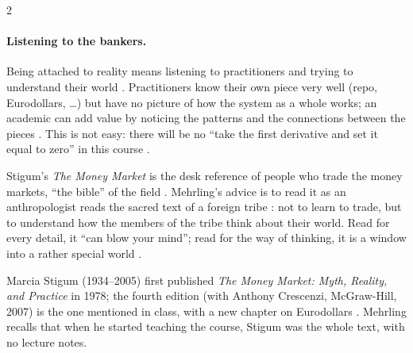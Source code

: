 \begin{paracol}{2}
\paragraph{Listening to the bankers.} Being attached to reality means listening to practitioners and
trying to understand their world . Practitioners know their own piece very well (repo,
Eurodollars, \dots) but have no picture of how the system as a whole works; an academic can add value
by noticing the patterns and the connections between the pieces . This is not easy:
there will be no ``take the first derivative and set it equal to zero'' in this course .

\begin{intuition}
Stigum's \emph{The Money Market} is the desk reference of people who trade the money markets, ``the
bible'' of the field . Mehrling's advice is to read it as an anthropologist reads the
sacred text of a foreign tribe : not to learn to trade, but to understand how the
members of the tribe think about their world. Read for every detail, it ``can blow your mind''; read for
the way of thinking, it is a window into a rather special world .
\end{intuition}\begin{aside}[Stigum]
Marcia Stigum (1934--2005) first published \emph{The Money Market: Myth, Reality, and Practice} in 1978;
the fourth edition (with Anthony Crescenzi, McGraw-Hill, 2007) is the one mentioned in class, with a
new chapter on Eurodollars . Mehrling recalls that when he started teaching the course,
Stigum was the whole text, with no lecture notes.
\end{aside}


\end{paracol}

